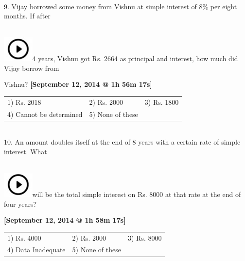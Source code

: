 \documentclass{article}
\begin{document}
	\noindent 
	
	\noindent 
	
	\noindent \\  9.   Vijay borrowed some money from Vishnu at simple interest of 8\% per eight months. If after
	
	\noindent  
\noindent \\ \includegraphics*[width=0.61in, height=0.52in]{images/image1}4 years, Vishnu got Rs. 2664 as principal and interest, how much did Vijay borrow from
	
	\noindent Vishnu?     \textbf{[September 12, 2014 @ 1h 56m 17s]}
	
	\noindent 
	

		\begin{tabular}{p{1.7in} p{1.6in} p{1.6in}} \\ 
 1) Rs. 2018  &  2) Rs. 2000  &  3) Rs. 1800  
		\\
4) Cannot be determined  & 5) None of these  \\
\end{tabular} 

	
	
	
	\noindent 
	
	\noindent 
	
	\noindent \\  10. An amount doubles itself at the end of 8 years with a certain rate of simple interest. What
	
	\noindent  
\noindent \\ \includegraphics*[width=0.61in, height=0.52in]{images/image1}will be the total simple interest on Rs. 8000 at that rate at the end of four years?
	
	\noindent \textbf{[September 12, 2014 @ 1h 58m 17s]}
	
	\noindent 
	

		\begin{tabular}{p{1.7in} p{1.6in} p{1.6in}} \\ 
 1) Rs. 4000 &  2) Rs. 2000  &  3) Rs. 8000  
		\\
4) Data Inadequate  & 5) None of these  \\
\end{tabular}
	
\end{document}
